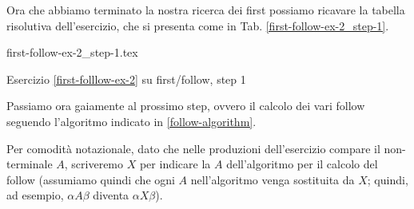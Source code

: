 \documentclass[class=book, crop=false, oneside, 12pt]{standalone}
\begin{document}
Ora che abbiamo terminato la nostra ricerca dei first possiamo ricavare la tabella risolutiva dell'esercizio, che si presenta come in Tab. \ref{first-follow-ex-2_step-1}.
\begin{table}[H]
	\centering
	{first-follow-ex-2_step-1.tex}
    \caption{Esercizio \ref{first-folllow-ex-2} su first/follow, step 1}
    \label{first-follow-ex-2_step-1}
\end{table}
Passiamo ora gaiamente al prossimo step, ovvero il calcolo dei vari follow seguendo l'algoritmo indicato in \ref{follow-algorithm}.

Per comodità notazionale, dato che nelle produzioni dell'esercizio compare il non-terminale \(A\), scriveremo \(X\) per indicare la \(A\) dell'algoritmo per il calcolo del follow (assumiamo quindi che ogni \(A\) nell'algoritmo venga sostituita da \(X\); quindi, ad esempio, \(\alpha A \beta\) diventa \(\alpha X \beta\)).
\end{document}
